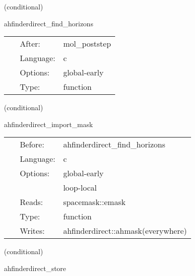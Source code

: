 \vspace{5mm}

   (conditional) 

\hspace{5mm} ahfinderdirect\_find\_horizons 

\hspace{5mm}{\it find apparent horizon(s) after this time step } 


\hspace{5mm}

 \begin{tabular*}{160mm}{cll} 
~ & After:  & mol\_poststep \\ 
~ & Language:  & c \\ 
~ & Options:  & global-early \\ 
~ & Type:  & function \\ 
\end{tabular*} 


\vspace{5mm}

   (conditional) 

\hspace{5mm} ahfinderdirect\_import\_mask 

\hspace{5mm}{\it import the excision mask } 


\hspace{5mm}

 \begin{tabular*}{160mm}{cll} 
~ & Before:  & ahfinderdirect\_find\_horizons \\ 
~ & Language:  & c \\ 
~ & Options:  & global-early \\ 
~& ~ &loop-local\\ 
~ & Reads:  & spacemask::emask \\ 
~ & Type:  & function \\ 
~ & Writes:  & ahfinderdirect::ahmask(everywhere) \\ 
\end{tabular*} 


\vspace{5mm}

   (conditional) 

\hspace{5mm} ahfinderdirect\_store 

\hspace{5mm}{\it store apparent horizon(s) into spherical surface(s) } 


